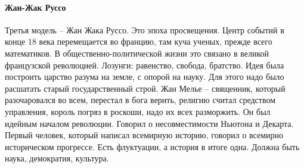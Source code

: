 \documentclass[a4paper, 12pt]{article}
\begin{document}
\paragraph{Жан-Жак Руссо}Третья модель -- Жан Жака Руссо. Это эпоха просвещения. Центр событий в конце 18 века перемещается во францию, там куча ученых, прежде всего математиков. В общественно-политической жизни это связано в великой французской революцией. Лозунги: равенство, свобода, братство. Идея была построить царство разума на земле, с опорой на науку. Для этого надо было расшатать старый государственный строй. Жан Мелье -- священник, который разочаровался во всем, перестал в бога верить, религию считал средством управления, король погряз в роскоши, надо их всех разморжить. Он был идейным началом революции. Говорил о несовместимости Ньютона и Декарта. Первый человек, который написал всемирную историю, говорил о всемирно историческом прогрессе. Есть флуктуации, а история в итоге одна. Должна быть наука, демократия, культура. 
\end{document}
